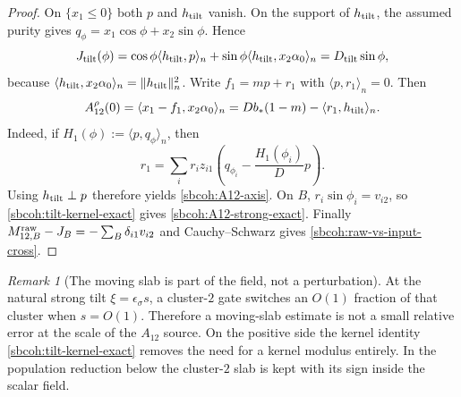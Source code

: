 \documentclass{article} %
\theoremstyle{plain}
\theoremstyle{definition}
\theoremstyle{remark}
\newtheorem{remark}[theorem]{Remark}
\begin{document}
\begin{proof}
On $\{x_1\le0\}$ both $p$ and $h_{\rm tilt}$ vanish.  On the support of
$h_{\rm tilt}$, the assumed purity gives
$q_\phi=x_1\cos\phi+x_2\sin\phi$.  Hence
\[
 J_{\rm tilt}(\phi)
 =\cos\phi\langle h_{\rm tilt},p\rangle_n
 +\sin\phi\langle h_{\rm tilt},x_2\alpha_0\rangle_n
 =D_{\rm tilt}\sin\phi,
\]
because
$\langle h_{\rm tilt},x_2\alpha_0\rangle_n=\|h_{\rm tilt}\|_n^2$.
Write $f_1=mp+r_1$ with $\langle p,r_1\rangle_n=0$.  Then
\[
 A_{12}^\rho(0)
 =\langle x_1-f_1,x_2\alpha_0\rangle_n
 =Db_*(1-m)-\langle r_1,h_{\rm tilt}\rangle_n.
\]
Indeed, if
$H_1(\phi):=\langle p,q_\phi\rangle_n$, then
\[
 r_1=\sum_i r_i z_{i1}
 \left(q_{\phi_i}-\frac{H_1(\phi_i)}{D}p\right).
\]
Using $h_{\rm tilt}\perp p$ therefore yields
\eqref{sbcoh:A12-axis}.  On $B$,
$r_i\sin\phi_i=v_{i2}$, so \eqref{sbcoh:tilt-kernel-exact} gives
\eqref{sbcoh:A12-strong-exact}.  Finally
$M_{12,B}^{\rm raw}-J_B=-\sum_B\delta_{i1}v_{i2}$ and Cauchy--Schwarz gives
\eqref{sbcoh:raw-vs-input-cross}.
\end{proof}

\begin{remark}[The moving slab is part of the field, not a perturbation]
\label{sbcoh:slab-not-error}
At the natural strong tilt
$\xi=\epsilon_\sigma s$, a cluster-$2$ gate switches an $O(1)$ fraction of
that cluster when $s=O(1)$.  Therefore a moving-slab estimate is not a small
relative error at the scale of the $A_{12}$ source.  On the positive side the
kernel identity \eqref{sbcoh:tilt-kernel-exact} removes the need for a kernel
modulus entirely.  In the population reduction below the cluster-$2$ slab is
kept with its sign inside the scalar field.
\end{remark}
\end{document}
